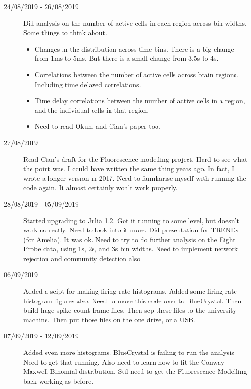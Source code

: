 \documentclass[a4paper,12pt]{article}
\theoremstyle{definition}
\begin{document}
\begin{description}
                                \item[24/08/2019 - 26/08/2019] Did analysis on the number of active cells in each region across bin widths. Some things to think about.
                                  \begin{itemize}
                                    \item Changes in the distribution across time bins. There is a big change from 1ms to 5ms. But there is a small change from 3.5s to 4s.
                                    \item Correlations between the number of active cells across brain regions. Including time delayed correlations.
                                    \item Time delay correlations between the number of active cells in a region, and the individual cells in that region.
                                    \item Need to read Okun, and Cian's paper too.
                                  \end{itemize}

                                \item[27/08/2019] Read Cian's draft for the Fluorescence modelling project. Hard to see what the point was. I could have written the same thing years ago. In fact, I wrote a longer version in 2017. Need to familiarise myself with running the code again. It almost certainly won't work properly.

                                \item[28/08/2019 - 05/09/2019] Started upgrading to Julia 1.2. Got it running to some level, but doesn't work correctly. Need to look into it more. Did presentation for TRENDs (for Amelia). It was ok. Need to try to do further analysis on the Eight Probe data, using 1s, 2s, and 3s bin widths. Need to implement network rejection and community detection also.

                                \item[06/09/2019] Added a scipt for making firing rate histograms. Added some firing rate histogram figures also. Need to move this code over to BlueCrystal. Then build huge spike count frame files. Then scp these files to the university machine. Then put those files on the one drive, or a USB.

                                \item[07/09/2019 - 12/09/2019] Added even more histograms. BlueCrystal is failing to run the analysis. Need to get that running. Also need to learn how to fit the Conway-Maxwell Binomial distribution. Stil need to get the Fluorescence Modelling back working as before.


\end{description}
\end{document}
